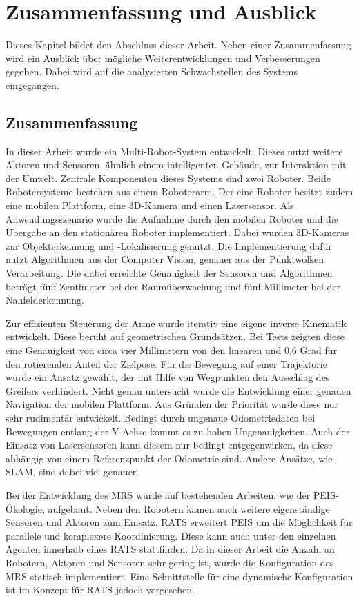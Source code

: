 \section{Zusammenfassung und Ausblick}
Dieses Kapitel bildet den Abschluss dieser Arbeit.  Neben einer Zusammenfassung wird ein Ausblick über mögliche Weiterentwicklungen und Verbesserungen gegeben. Dabei wird auf die analysierten Schwachstellen des Systems eingegangen.

\subsection{Zusammenfassung}
In dieser Arbeit wurde ein Multi-Robot-System entwickelt. Dieses nutzt weitere Aktoren und Sensoren, ähnlich einem intelligenten Gebäude, zur Interaktion mit der Umwelt. Zentrale Komponenten dieses Systems sind zwei Roboter. Beide Robotersysteme bestehen aus einem Roboterarm. Der eine Roboter besitzt zudem eine mobilen Plattform, eine 3D-Kamera und einen Lasersensor. Als Anwendungsszenario wurde die Aufnahme durch den mobilen Roboter und die Übergabe an den stationären Roboter implementiert. Dabei wurden 3D-Kameras zur Objekterkennung und -Lokalisierung genutzt. Die Implementierung dafür nutzt Algorithmen aus der Computer Vision, genauer aus der Punktwolken Verarbeitung. Die dabei erreichte Genauigkeit der Sensoren und Algorithmen beträgt fünf Zentimeter bei der Raumüberwachung und fünf Millimeter bei der Nahfelderkennung. 

Zur effizienten Steuerung der Arme wurde iterativ eine eigene inverse Kinematik entwickelt. Diese beruht auf geometrischen Grundsätzen. Bei Tests zeigten diese eine Genauigkeit von circa vier Millimetern von den linearen und 0,6 Grad für den rotierenden Anteil der Zielpose. Für die Bewegung auf einer Trajektorie wurde ein Ansatz gewählt, der mit Hilfe von Wegpunkten den Ausschlag des Greifers verhindert. Nicht genau untersucht wurde die Entwicklung einer genauen Navigation der mobilen Plattform. Aus Gründen der Priorität wurde diese nur sehr rudimentär entwickelt. Bedingt durch ungenaue Odometriedaten bei Bewegungen entlang der Y-Achse kommt es zu hohen Ungenauigkeiten. Auch der Einsatz von Lasersensoren kann diesem nur bedingt entgegenwirken, da diese abhängig von einem Referenzpunkt der Odometrie sind. Andere Ansätze, wie SLAM, sind dabei viel genauer.

 Bei der Entwicklung des MRS wurde auf bestehenden Arbeiten, wie der PEIS-Ökologie, aufgebaut. Neben den Robotern kamen auch weitere eigenständige Sensoren und Aktoren zum Einsatz. RATS erweitert PEIS um die Möglichkeit für parallele und komplexere Koordinierung. Diese kann auch unter den einzelnen Agenten innerhalb eines RATS stattfinden. Da in dieser Arbeit die Anzahl an Robotern, Aktoren und Sensoren sehr gering ist, wurde die Konfiguration des MRS statisch implementiert. Eine Schnittstelle für eine dynamische Konfiguration ist im Konzept für RATS jedoch vorgesehen.

